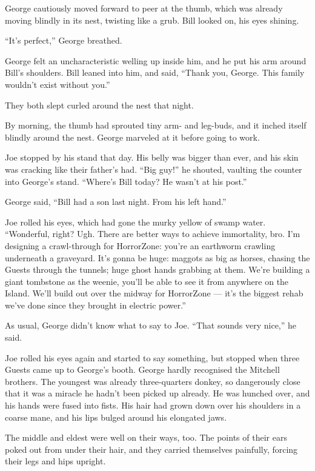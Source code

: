 George cautiously moved forward to peer at the thumb, which was
already moving blindly in its nest, twisting like a grub. Bill
looked on, his eyes shining.

``It's perfect,'' George breathed.

George felt an uncharacteristic welling up inside him, and he put
his arm around Bill's shoulders. Bill leaned into him, and said,
``Thank you, George. This family wouldn't exist without you.''

They both slept curled around the nest that night.

By morning, the thumb had sprouted tiny arm- and leg-buds, and it
inched itself blindly around the nest. George marveled at it before
going to work.

Joe stopped by his stand that day. His belly was bigger than ever,
and his skin was cracking like their father's had. ``Big guy!'' he
shouted, vaulting the counter into George's stand.
``Where's Bill today? He wasn't at his post.''

George said, ``Bill had a son last night. From his left hand.''

Joe rolled his eyes, which had gone the murky yellow of swamp
water.
``Wonderful, right? Ugh. There are better ways to achieve immortality, bro. I'm 
designing a crawl-through for HorrorZone: you're an earthworm crawling 
underneath a graveyard. It's gonna be huge: maggots as big as horses, chasing 
the Guests through the tunnels; huge ghost hands grabbing at them. We're 
building a giant tombstone as the weenie, you'll be able to see it from 
anywhere on the Island. We'll build out over the midway for HorrorZone --- it's 
the biggest rehab we've done since they brought in electric power.''

As usual, George didn't know what to say to Joe.
``That sounds very nice,'' he said.

Joe rolled his eyes again and started to say something, but stopped
when three Guests came up to George's booth. George hardly
recognised the Mitchell brothers. The youngest was already
three-quarters donkey, so dangerously close that it was a miracle
he hadn't been picked up already. He was hunched over, and his
hands were fused into fists. His hair had grown down over his
shoulders in a coarse mane, and his lips bulged around his
elongated jaws.

The middle and eldest were well on their ways, too. The points of
their ears poked out from under their hair, and they carried
themselves painfully, forcing their legs and hips upright.


